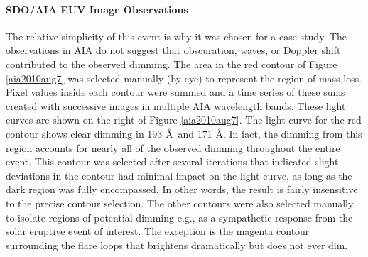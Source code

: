 \paragraph{SDO/AIA EUV Image Observations}
The relative simplicity of this event is why it was chosen for a case study. The observations in AIA do not suggest that obscuration, waves, or Doppler shift contributed to the observed dimming. The area in the red contour of Figure \ref{aia2010aug7} was selected manually (by eye) to represent the region of mass loss. Pixel values inside each contour were summed and a time series of these sums created with successive images in multiple AIA wavelength bands. These light curves are shown on the right of Figure \ref{aia2010aug7}. The light curve for the red contour shows clear dimming in 193 \AA\ and 171 \AA. In fact, the dimming from this region accounts for nearly all of the observed dimming throughout the entire event. This contour was selected after several iterations that indicated slight deviations in the contour had minimal impact on the light curve, as long as the dark region was fully encompassed. In other words, the result is fairly insensitive to the precise contour selection. The other contours were also selected manually to isolate regions of potential dimming e.g., as a sympathetic response from the solar eruptive event of interest. The exception is the magenta contour surrounding the flare loops that brightens dramatically but does not ever dim. 

